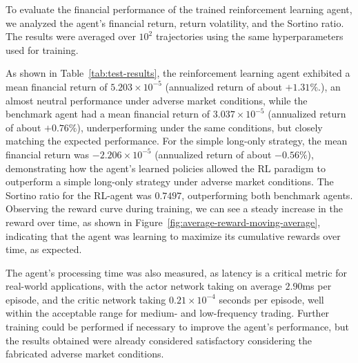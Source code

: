 To evaluate the financial performance of the trained reinforcement learning agent, we analyzed the agent's
financial return, return volatility, and the Sortino ratio.
The results were averaged over $10^2$ trajectories using the same hyperparameters used for training.

As shown in Table~\ref{tab:test-results}, the reinforcement learning agent exhibited a mean financial return of $5.203 \times 10^{-5}$
(annualized return of about $+1.31\%$.), an almost neutral performance under adverse market conditions,
while the benchmark agent had a mean financial return of $3.037 \times 10^{-5}$ (annualized return of about $+0.76\%$),
underperforming under the same conditions, but closely matching the expected performance.
For the simple long-only strategy, the mean financial return was $-2.206 \times 10^{-5}$ (annualized return of about $-0.56\%$),
demonstrating how the agent's learned policies allowed the RL paradigm to outperform a simple long-only strategy under adverse market conditions.
The Sortino ratio for the RL-agent was $0.7497$, outperforming both benchmark agents.
Observing the reward curve during training, we can see a steady increase in the reward over time, as shown in Figure~\ref{fig:average-reward-moving-average},
indicating that the agent was learning to maximize its cumulative rewards over time, as expected.

The agent's processing time was also measured, as latency is a critical metric for real-world applications,
with the actor network taking on average $2.90$ms per episode, and the critic network taking $0.21 \times 10^{-4}$ seconds per episode,
well within the acceptable range for medium- and low-frequency trading.
Further training could be performed if necessary to improve the agent's performance, but the results obtained were already considered satisfactory
considering the fabricated adverse market conditions.

